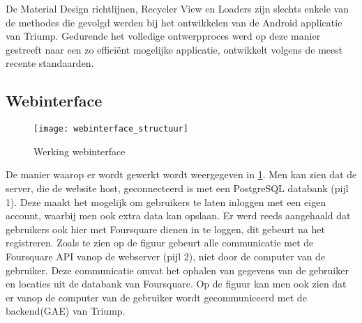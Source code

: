 De Material Design richtlijnen, Recycler View en Loaders zijn slechts enkele van de methodes die gevolgd werden bij het ontwikkelen van de Android applicatie van Triump. Gedurende het volledige ontwerpproces werd op deze manier gestreeft naar een zo efficiënt mogelijke applicatie, ontwikkelt volgens de meest recente standaarden. \cite{successapp}
\subsection{Webinterface}
\begin{figure}[H]
	\centering
	\texttt{[image: webinterface\_structuur]}
	\caption{Werking webinterface}
	\label{fig:Webinterface}
\end{figure}
De manier waarop er wordt gewerkt wordt weergegeven in \ref{fig:Webinterface}. Men kan zien dat de server, die de website host, geconnecteerd is met een PostgreSQL databank (pijl 1). Deze maakt het mogelijk om gebruikers te laten inloggen met een eigen account, waarbij men ook extra data kan opslaan. Er werd reeds aangehaald dat gebruikers ook hier met Foursquare dienen in te loggen, dit gebeurt na het registreren. Zoals te zien op de figuur gebeurt alle communicatie met de Foursquare API vanop de webserver (pijl 2), niet door de computer van de gebruiker. Deze communicatie omvat het ophalen van gegevens van de gebruiker en locaties uit de databank van Foursquare.
Op de figuur kan men ook zien dat er vanop de computer van de gebruiker wordt gecommuniceerd met de backend(GAE) van Triump.

